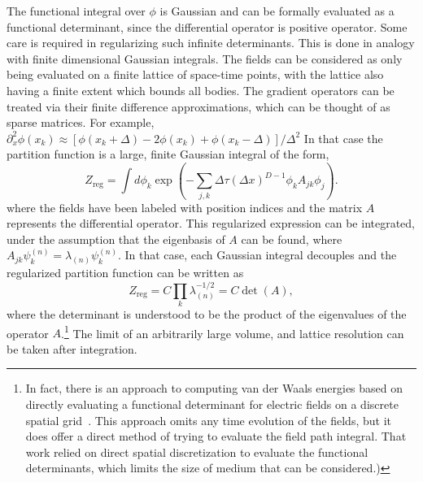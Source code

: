 The functional integral over $\phi$ is Gaussian and can be formally evaluated as a 
functional determinant, since the differential operator is positive operator.  
Some care is required in regularizing such infinite determinants.
This is done in analogy with finite dimensional Gaussian integrals.  
The fields can be considered as only being evaluated on a finite lattice of space-time points,
with the lattice also having a finite extent which bounds all bodies.  
The gradient operators can be treated via their finite difference approximations, 
which can be thought of as sparse matrices.
For example, $\partial_x^2\phi(x_k) \approx [\phi(x_k+\Delta)-2\phi(x_k)+\phi(x_k-\Delta)]/\Delta^2$
In that case the partition function is a large, finite Gaussian integral of the form, 
\begin{equation}
  Z_{\text{reg}} = \int d\phi_k\exp\left(-\sum_{j,k}\Delta \tau (\Delta x)^{D-1}\phi_k A_{jk}\phi_j\right).
\end{equation}
where the fields have been labeled with position indices and the matrix $A$ represents the differential
operator.  
This regularized expression can be integrated, under the assumption that the eigenbasis of $A$ can be found,
where $A_{jk}\psi^{(n)}_k=\lambda_{(n)}\psi^{(n)}_k$.  In that case, each Gaussian integral decouples and the 
regularized partition function can be written as 
\begin{equation}
   Z_{\text{reg}} = C \prod_k \lambda_{(n)}^{-1/2} = C \det(A),
\end{equation}
where the determinant is understood to be the product of the eigenvalues of the operator $A$.\footnote{
In fact, there is an approach to computing van der Waals energies based on directly 
evaluating a functional determinant for electric fields on a discrete spatial grid~\cite{Maggs2006,Pasquali2008}. This approach 
omits any time evolution of the fields, but it does offer a direct method of trying to evaluate the field path integral.
That work relied on direct spatial discretization to evaluate the functional determinants, which limits
the size of medium that can be considered.)
}
The limit of an arbitrarily large volume, and lattice resolution can be taken after integration.

